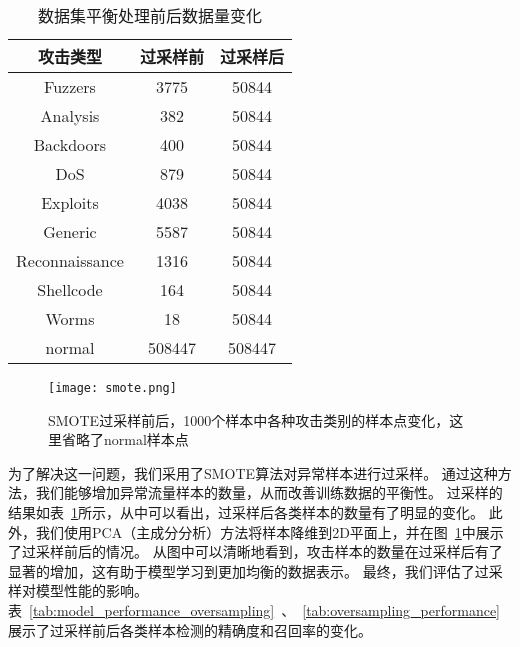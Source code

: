 \begin{table}
  \centering
  \caption{数据集平衡处理前后数据量变化}
  \label{tab:attack_num}
\begin{tabular}{ccc}
\toprule
\textbf{攻击类型}&\textbf{过采样前}&\textbf{过采样后}\\
\midrule
Fuzzers&3775&50844\\
Analysis&382&50844\\
Backdoors&400&50844\\
DoS&879&50844\\
Exploits&4038&50844\\
Generic&5587&50844\\
Reconnaissance&1316&50844\\
Shellcode&164&50844\\
Worms&18&50844\\
normal&508447&508447\\
  \bottomrule
\end{tabular}
  
\end{table}
\begin{figure}[htbp]
  \centering
  \texttt{[image: smote.png]}
  \caption{SMOTE过采样前后，1000个样本中各种攻击类别的样本点变化，这里省略了normal样本点}
  \label{fig:prepostsmote}
\end{figure}

为了解决这一问题，我们采用了SMOTE算法对异常样本进行过采样。
通过这种方法，我们能够增加异常流量样本的数量，从而改善训练数据的平衡性。
过采样的结果如表~\ref{tab:attack_num}所示，从中可以看出，过采样后各类样本的数量有了明显的变化。
此外，我们使用PCA（主成分分析）方法将样本降维到2D平面上，并在图~\ref{fig:prepostsmote}中展示了过采样前后的情况。
从图中可以清晰地看到，攻击样本的数量在过采样后有了显著的增加，这有助于模型学习到更加均衡的数据表示。
最终，我们评估了过采样对模型性能的影响。
表~\ref{tab:model_performance_oversampling}~、~\ref{tab:oversampling_performance}~展示了过采样前后各类样本检测的精确度和召回率的变化。


